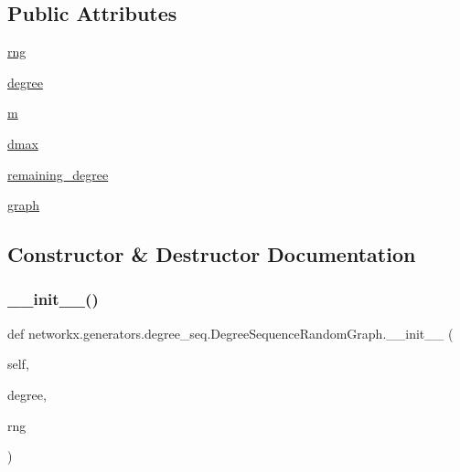\subsection*{Public Attributes}
\begin{DoxyCompactItemize}
\item 
\hyperlink{classnetworkx_1_1generators_1_1degree__seq_1_1DegreeSequenceRandomGraph_a454449cec97996eccfa28577c5055d76}{rng}
\item 
\hyperlink{classnetworkx_1_1generators_1_1degree__seq_1_1DegreeSequenceRandomGraph_a96bccf4dd0c73fdd2569d20f7770212b}{degree}
\item 
\hyperlink{classnetworkx_1_1generators_1_1degree__seq_1_1DegreeSequenceRandomGraph_a1bf1430073440053dee91f2cf0995dab}{m}
\item 
\hyperlink{classnetworkx_1_1generators_1_1degree__seq_1_1DegreeSequenceRandomGraph_a74ce87a5c0da3b6fba83add40243074c}{dmax}
\item 
\hyperlink{classnetworkx_1_1generators_1_1degree__seq_1_1DegreeSequenceRandomGraph_accd862f172f6f2e0c5e518f60eeb03eb}{remaining\+\_\+degree}
\item 
\hyperlink{classnetworkx_1_1generators_1_1degree__seq_1_1DegreeSequenceRandomGraph_ae5394f901b8f7b46fc671efdccb66bb7}{graph}
\end{DoxyCompactItemize}


\subsection{Constructor \& Destructor Documentation}
\mbox{\label{classnetworkx_1_1generators_1_1degree__seq_1_1DegreeSequenceRandomGraph_abda1215d49ed03bca8b727bfaa3da4e8}} 
\subsubsection{\texorpdfstring{\+\_\+\+\_\+init\+\_\+\+\_\+()}{\_\_init\_\_()}}
{\footnotesize\ttfamily def networkx.\+generators.\+degree\+\_\+seq.\+Degree\+Sequence\+Random\+Graph.\+\_\+\+\_\+init\+\_\+\+\_\+ (\begin{DoxyParamCaption}\item[{}]{self,  }\item[{}]{degree,  }\item[{}]{rng }\end{DoxyParamCaption})}



